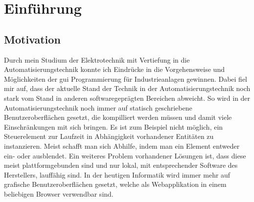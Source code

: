 \chapter{Einführung}
\section{Motivation}
Durch mein Studium der Elektrotechnik mit Vertiefung in die Automatisierungstechnik konnte ich Eindrücke in die Vorgehensweise und 
Möglichkeiten der \ac{gui} Programmierung für Industrieanlagen gewinnen. %
Dabei fiel mir auf, dass der aktuelle Stand der Technik in  der Automatisierungstechnik noch stark 
vom Stand in anderen softwaregeprägten Bereichen abweicht.
So wird in der Automatisierungstechnik noch immer auf statisch geschriebene Benutzeroberflächen gesetzt, 
die kompilliert werden müssen und damit viele Einschränkungen mit sich bringen.
Es ist zum Beispiel nicht möglich, ein Steuerelement zur Laufzeit in Abhängigkeit vorhandener Entitäten zu instanzieren. 
Meist schafft man sich Abhilfe, indem man ein Element entweder ein- oder ausblendet.
Ein weiteres Problem vorhandener Lösungen ist, dass diese meist plattformgebunden sind und nur lokal, 
mit entsprechender Software des Herstellers, lauffähig sind.
In der heutigen Informatik wird immer mehr auf grafische Benutzeroberflächen gesetzt, 
welche als Webapplikation in einem beliebigen Browser verwendbar sind.

